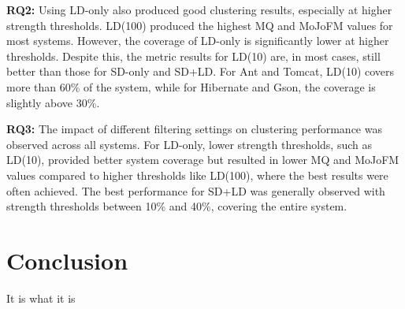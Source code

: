 \documentclass{ieeeaccess}
\begin{document}
\textbf{RQ2:} Using LD-only also produced good clustering results, especially at higher strength thresholds. LD(100) produced the highest MQ and MoJoFM values for most systems. However, the coverage of LD-only is significantly lower at higher thresholds. Despite this, the metric results for LD(10) are, in most cases, still better than those for SD-only and SD+LD. For Ant and Tomcat, LD(10) covers more than 60\% of the system, while for Hibernate and Gson, the coverage is slightly above 30\%.


\textbf{RQ3:} The impact of different filtering settings on clustering performance was observed across all systems. For LD-only, lower strength thresholds, such as LD(10), provided better system coverage but resulted in lower MQ and MoJoFM values compared to higher thresholds like LD(100), where the best results were often achieved. The best performance for SD+LD was generally observed with strength thresholds between 10\% and 40\%, covering the entire system.


\section{Conclusion}
\label{sec:conclusion}
It is what it is
\end{document}
